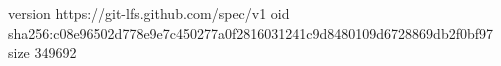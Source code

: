 version https://git-lfs.github.com/spec/v1
oid sha256:c08e96502d778e9e7c450277a0f2816031241c9d8480109d6728869db2f0bf97
size 349692
